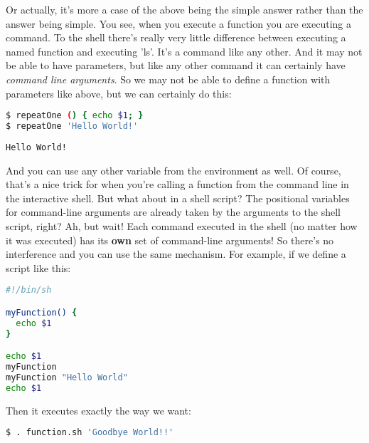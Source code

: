 Or actually, it's more a case of the above being the simple answer rather than
the answer being simple. You see, when you execute a function you are executing
a command. To the shell there's really very little difference between executing
a named function and executing 'ls'. It's a command like any other. And it may
not be able to have parameters, but like any other command it can certainly
have \emph{command line arguments}. So we may not be able to define a function
with parameters like above, but we can certainly do this:
\lstset{basicstyle=\scriptsize, numbers=left, captionpos=b, tabsize=4}
\begin{lstlisting}[caption=Functions with command-line arguments,language={bash},
breaklines=true,xleftmargin=15pt,label=lst:Functions with command-line arguments]
$ repeatOne () { echo $1; }
$ repeatOne 'Hello World!'
\end{lstlisting}

\scriptsize
\begin{verbatim}
Hello World!
\end{verbatim}
\normalsize

And you can use any other variable from the environment as well. Of course,
that's a nice trick for when you're calling a function from the command line in
the interactive shell. But what about in a shell script? The positional
variables for command-line arguments are already taken by the arguments to the
shell script, right? Ah, but wait! Each command executed in the shell (no
matter how it was executed) has its \textbf{own} set of command-line arguments!
So there's no interference and you can use the same mechanism. For example, if
we define a script like this:


\lstset{basicstyle=\scriptsize, numbers=left, captionpos=b, tabsize=4}
\begin{lstlisting}[caption=function.sh: A function in a shell script,language={bash},
breaklines=true,xleftmargin=15pt,label=lst:function.sh: A function in a shell script]
#!/bin/sh

myFunction() {
  echo $1
}

echo $1
myFunction
myFunction "Hello World"
echo $1
\end{lstlisting}

Then it executes exactly the way we want:

\lstset{basicstyle=\scriptsize, numbers=left, captionpos=b, tabsize=4}
\begin{lstlisting}[caption=Executing the function.sh script,language={bash},
breaklines=true,xleftmargin=15pt,label=lst:Executing the function.sh script]
$ . function.sh 'Goodbye World!!'
\end{lstlisting}

